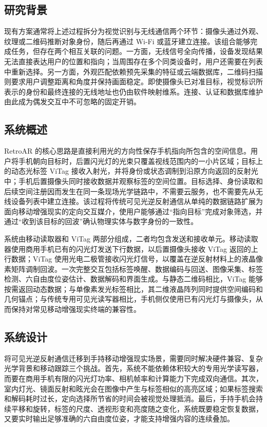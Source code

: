 \subsection{研究背景}
现有方案通常将上述过程拆分为视觉识别与无线通信两个环节：摄像头通过外观、纹理或二维码推断对象身份，随后再通过 Wi-Fi 或蓝牙建立连接。该组合能够完成任务，但存在两个相互关联的问题。一方面，无线信号全向传播，设备发现结果无法直接表达用户的位置和指向；当周围存在多个同类设备时，用户还需要在列表中重新选择。另一方面，外观匹配依赖预先采集的特征或云端数据库，二维码扫描则要求用户调整距离和角度并保持画面稳定。即使摄像头已对准目标，视觉标识所表示的身份和最终连接的无线地址也仍由软件映射维系。连接、认证和数据库维护由此成为偶发交互中不可忽略的固定开销。

\subsection{系统概述}
RetroAR 的核心思路是直接利用光的方向性保存手机指向所包含的空间信息。用户将手机朝向目标时，后置闪光灯的光束只覆盖视线范围内的一小片区域；目标上的动态光标签 ViTag 接收入射光，并将身份或状态调制到沿原方向返回的反射光中；手机后置摄像头同时接收数据并观察标签的空间位置。目标选择、身份读取和后续空间注册因而发生在同一条现场光学链路中，不需要云服务，也不需要先从无线设备列表中建立连接。该过程将传统可见光逆反射通信从单纯的数据链路扩展为面向移动增强现实的定向交互媒介，使用户能够通过“指向目标”完成对象筛选，并通过“收到该目标的回波”确认物理实体与数字身份的一致性。

系统由移动读取器和 ViTag 两部分组成，二者均包含发送和接收单元。移动读取器使用商用手机已有的闪光灯发送下行数据，以后置摄像头接收 ViTag 返回的上行数据；ViTag 使用光电二极管接收闪光灯信号，以覆盖在逆反射材料上的液晶像素矩阵调制回波。一次完整交互包括标签唤醒、数据编码与回送、图像采集、标签检测、六自由度位姿估计、数据解码和界面生成。与静态二维码相比，ViTag 能够按需返回动态数据；与单像素发光标签相比，其二维液晶阵列同时提供空间编码和几何锚点；与传统专用可见光读写器相比，手机侧仅使用已有闪光灯与摄像头，从而保持对常见移动增强现实终端的兼容性。

\subsection{系统设计}
将可见光逆反射通信迁移到手持移动增强现实场景，需要同时解决硬件兼容、复杂光学背景和移动跟踪三个挑战。首先，系统不能依赖体积较大的专用光学读写器，而要在商用手机有限的闪光灯功率、相机帧率和计算能力下完成双向通信。其次，室内灯光、镜面反射和眩光会在图像中产生与标签相似的高亮区域；如果标签搜索和解码耗时过长，定向选择所节省的时间会被视觉处理抵消。最后，手持手机会持续平移和旋转，标签的尺度、透视形变和亮度随之变化，系统既要稳定恢复数据，又要实时输出足够准确的六自由度位姿，才能支持增强内容的连续叠加。

